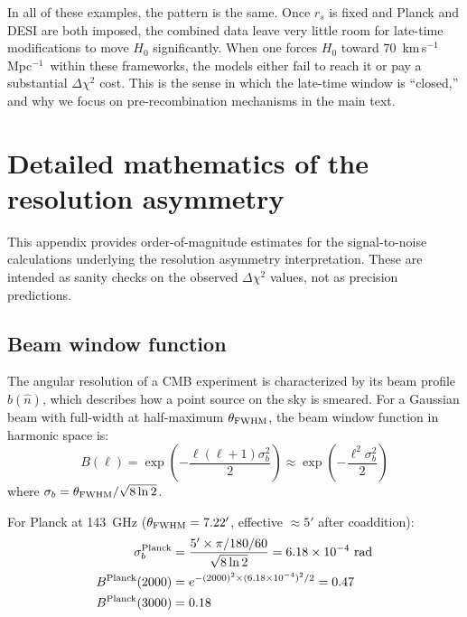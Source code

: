 \documentclass[twocolumn,showpacs,preprintnumbers,amsmath,amssymb,prd]{revtex4-2}
\newcommand{\kms}{km\,s$^{-1}$\,Mpc$^{-1}$}
\begin{document}
In all of these examples, the pattern is the same. Once $r_s$ is fixed and Planck 
and DESI are both imposed, the combined data leave very little room for late-time 
modifications to move $H_0$ significantly. When one forces $H_0$ toward 
70~\kms\ within these frameworks, the models either fail to 
reach it or pay a substantial $\Delta\chi^2$ cost. This is the sense in which the 
late-time window is ``closed,'' and why we focus on pre-recombination mechanisms in 
the main text.

\section{Detailed mathematics of the resolution asymmetry}
\label{app:math}

This appendix provides order-of-magnitude estimates for the signal-to-noise 
calculations underlying the resolution asymmetry interpretation. These are 
intended as sanity checks on the observed $\Delta\chi^2$ values, not as 
precision predictions.

\subsection{Beam window function}

The angular resolution of a CMB experiment is characterized by its beam profile 
$b(\hat n)$, which describes how a point source on the sky is smeared. For a 
Gaussian beam with full-width at half-maximum $\theta_{\rm FWHM}$, the beam 
window function in harmonic space is:
\begin{equation}
B(\ell) = \exp\left(-\frac{\ell(\ell+1)\sigma_b^2}{2}\right) 
\approx \exp\left(-\frac{\ell^2\sigma_b^2}{2}\right)
\end{equation}
where $\sigma_b = \theta_{\rm FWHM}/\sqrt{8\ln 2}$.

For Planck at 143~GHz ($\theta_{\rm FWHM} = 7.22'$, effective $\approx 5'$ 
after coaddition):
\begin{align}
\sigma_b^{\rm Planck} &= \frac{5' \times \pi/180/60}{\sqrt{8\ln 2}} 
= 6.18 \times 10^{-4}~\text{rad} \\
B^{\rm Planck}(2000) &= e^{-(2000)^2 \times (6.18\times 10^{-4})^2/2} = 0.47 \\
B^{\rm Planck}(3000) &= 0.18
\end{align}
\end{document}
